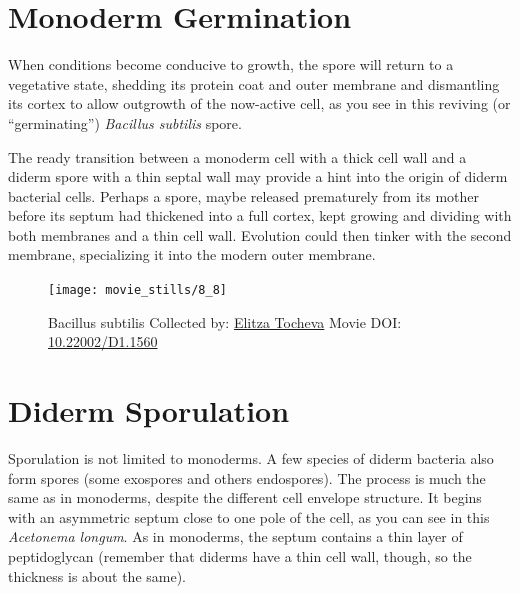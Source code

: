 \documentclass[]{tufte-book}
\begin{document}
\section{Monoderm Germination}\label{monoderm-germination}

When conditions become conducive to growth, the spore will return to a
vegetative state, shedding its protein coat and outer membrane and
dismantling its cortex to allow outgrowth of the now-active cell, as you
see in this reviving (or ``germinating'') \emph{Bacillus subtilis}
spore.

The ready transition between a monoderm cell with a thick cell wall and
a diderm spore with a thin septal wall may provide a hint into the
origin of diderm bacterial cells. Perhaps a spore, maybe released
prematurely from its mother before its septum had thickened into a full
cortex, kept growing and dividing with both membranes and a thin cell
wall. Evolution could then tinker with the second membrane, specializing
it into the modern outer membrane.





\begin{figure}
\texttt{[image: movie\_stills/8\_8]} \caption[Bacillus subtilis Collected by:
\protect\hyperlink{elitza_tocheva}{Elitza Tocheva} Movie DOI:
\href{https://doi.org/10.22002/D1.1560}{10.22002/D1.1560}]{Bacillus subtilis Collected by:
\protect\hyperlink{elitza_tocheva}{Elitza Tocheva} Movie DOI:
\href{https://doi.org/10.22002/D1.1560}{10.22002/D1.1560}}\label{fig:8-8}
\end{figure}

\section{Diderm Sporulation}\label{diderm-sporulation}

Sporulation is not limited to monoderms. A few species of diderm
bacteria also form spores (some exospores and others endospores). The
process is much the same as in monoderms, despite the different cell
envelope structure. It begins with an asymmetric septum close to one
pole of the cell, as you can see in this \emph{Acetonema longum}. As in
monoderms, the septum contains a thin layer of peptidoglycan (remember
that diderms have a thin cell wall, though, so the thickness is about
the same).
\end{document}
